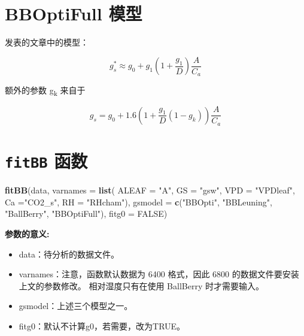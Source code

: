 \documentclass[]{krantz}
\makeatletter
\newenvironment{Shaded}{\begin{snugshade}}{\end{snugshade}}
\newcommand{\KeywordTok}[1]{\textcolor[rgb]{0.13,0.29,0.53}{\textbf{#1}}}
\newcommand{\DataTypeTok}[1]{\textcolor[rgb]{0.13,0.29,0.53}{#1}}
\newcommand{\StringTok}[1]{\textcolor[rgb]{0.31,0.60,0.02}{#1}}
\newcommand{\OtherTok}[1]{\textcolor[rgb]{0.56,0.35,0.01}{#1}}
\newcommand{\NormalTok}[1]{#1}
\providecommand{\tightlist}{%
  \setlength{\itemsep}{0pt}\setlength{\parskip}{0pt}}
\newenvironment{kframe}{%
\medskip{}
\setlength{\fboxsep}{.8em}
 \def\at@end@of@kframe{}%
 \ifinner\ifhmode%
  \def\at@end@of@kframe{\end{minipage}}%
  \begin{minipage}{\columnwidth}%
 \fi\fi%
 \def\FrameCommand##1{\hskip\@totalleftmargin \hskip-\fboxsep
 \colorbox{shadecolor}{##1}\hskip-\fboxsep
     \hskip-\linewidth \hskip-\@totalleftmargin \hskip\columnwidth}%
 \MakeFramed {\advance\hsize-\width
   \@totalleftmargin\z@ \linewidth\hsize
   \@setminipage}}%
 {\par\unskip\endMakeFramed%
 \at@end@of@kframe}
\renewenvironment{Shaded}{\begin{kframe}}{\end{kframe}}
\theoremstyle{definition}
\theoremstyle{definition}
\theoremstyle{definition}
\theoremstyle{remark}
\makeatother
\begin{document}
\section{BBOptiFull 模型}\label{bboptifull-}

\citet{Medlyn2011Reconciling} 发表的文章中的模型：

\begin{equation}
g_s^* \approx g_0 + g_1(1 + \frac{g_1}{D}) \frac{A}{C_a}
\label{eq:BBOptiFull}
\end{equation}

额外的参数 g\textsubscript{k} 来自于 \citet{Duursma2013Near}

\begin{equation}
g_s = g_0 + 1.6(1 + \frac{g_1}{D}(1-g_k)) \frac{A}{C_a}
\label{eq:Duursm}
\end{equation}

\section{\texorpdfstring{\texttt{fitBB}
函数}{fitBB 函数}}\label{fitbb-p}

\begin{Shaded}
\begin{Highlighting}[]
\KeywordTok{fitBB}\NormalTok{(data, }\DataTypeTok{varnames =} \KeywordTok{list}\NormalTok{(}
  \DataTypeTok{ALEAF =} \StringTok{"A"}\NormalTok{, }\DataTypeTok{GS =} \StringTok{"gsw"}\NormalTok{, }\DataTypeTok{VPD =} \StringTok{"VPDleaf"}\NormalTok{,}
  \DataTypeTok{Ca =}\StringTok{"CO2_s"}\NormalTok{, }\DataTypeTok{RH =} \StringTok{"RHcham"}\NormalTok{), }
  \DataTypeTok{gsmodel =} \KeywordTok{c}\NormalTok{(}\StringTok{"BBOpti"}\NormalTok{, }\StringTok{"BBLeuning"}\NormalTok{, }\StringTok{"BallBerry"}\NormalTok{,}
              \StringTok{"BBOptiFull"}\NormalTok{), }\DataTypeTok{fitg0 =} \OtherTok{FALSE}\NormalTok{)}
\end{Highlighting}
\end{Shaded}

\textbf{参数的意义:}

\begin{itemize}
\tightlist
\item
  data：待分析的数据文件。
\item
  varnames：注意，函数默认数据为 6400 格式，因此 6800
  的数据文件要安装上文的参数修改。 相对湿度只有在使用 BallBerry
  时才需要输入。
\item
  gsmodel：上述三个模型之一。
\item
  fitg0：默认不计算g0，若需要，改为TRUE。
\end{itemize}
\end{document}
